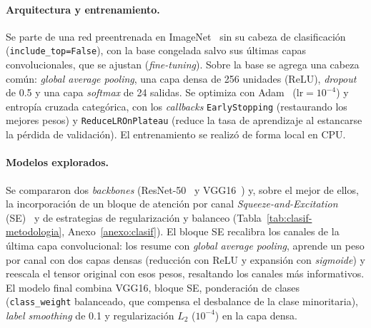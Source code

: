 \documentclass[11pt,a4paper]{article}
\begin{document}
\paragraph{Arquitectura y entrenamiento.} Se parte de una red preentrenada en
ImageNet~\cite{deng2009imagenet} sin su cabeza de clasificación
(\texttt{include\_top=False}), con la base congelada salvo sus últimas capas
convolucionales, que se ajustan (\textit{fine-tuning}). Sobre la base se agrega una
cabeza común: \textit{global average pooling}, una capa densa de 256 unidades
(ReLU), \textit{dropout} de 0.5 y una capa \textit{softmax} de 24 salidas. Se
optimiza con Adam~\cite{kingma2015adam} (\(\text{lr}=10^{-4}\)) y entropía cruzada
categórica, con los \textit{callbacks} \texttt{EarlyStopping} (restaurando los
mejores pesos) y \texttt{ReduceLROnPlateau} (reduce la tasa de aprendizaje al
estancarse la pérdida de validación). El entrenamiento se realizó de forma local en
CPU.

\paragraph{Modelos explorados.} Se compararon dos \textit{backbones}
(ResNet-50~\cite{he2016resnet} y VGG16~\cite{simonyan2015vgg}) y, sobre el mejor de
ellos, la incorporación de un bloque de atención por canal
\textit{Squeeze-and-Excitation} (SE)~\cite{hu2018senet} y de estrategias de
regularización y balanceo (Tabla~\ref{tab:clasif-metodologia},
Anexo~\ref{anexo:clasif}). El bloque SE
recalibra los canales de la última capa convolucional: los resume con \textit{global
average pooling}, aprende un peso por canal con dos capas densas (reducción con ReLU
y expansión con \textit{sigmoide}) y reescala el tensor original con esos pesos,
resaltando los canales más informativos. El modelo final combina VGG16, bloque SE,
ponderación de clases (\texttt{class\_weight} balanceado, que compensa el desbalance
de la clase minoritaria), \textit{label smoothing} de 0.1 y regularización \(L_2\)
(\(10^{-4}\)) en la capa densa.
\end{document}
